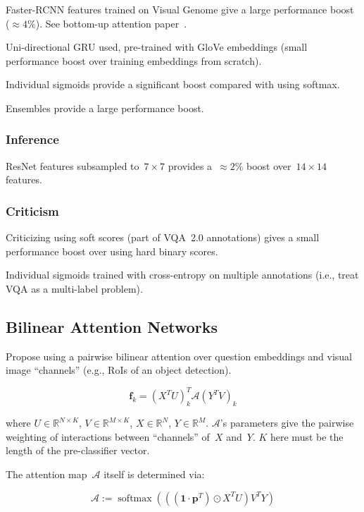 \documentclass[a4paper, 12pt]{article}
\DeclareMathOperator{\softmax}{softmax}
\begin{document}
Faster-RCNN features trained on Visual Genome give a large performance boost
($\approx 4\%$).  See bottom-up attention paper~\citet{anderson2017bottom}.

Uni-directional GRU used, pre-trained with GloVe embeddings (small performance
boost over training embeddings from scratch).

Individual sigmoids provide a significant boost compared with using softmax.

Ensembles provide a large performance boost.


\subsubsection{Inference}

ResNet features subsampled to~$7 \times 7$ provides a~$\approx 2\%$ boost
over~$14 \times 14$ features.


\subsubsection{Criticism}

Criticizing using soft scores (part of VQA~2.0 annotations) gives a small
performance boost over using hard binary scores.

Individual sigmoids trained with cross-entropy on multiple annotations (i.e.,
treat VQA as a multi-label problem).


\subsection{Bilinear Attention Networks}

Propose using a pairwise bilinear attention over question embeddings and visual
image ``channels'' (e.g., RoIs of an object detection).

\begin{equation}
\mathbf{f}_k = {(X^T U)}^T_k \mathcal{A} {(Y^T V)}_k
\end{equation}

where $U \in \mathbb{R}^{N \times K}$, $V \in \mathbb{R}^{M \times K}$,
$X \in \mathbb{R}^N$, $Y \in \mathbb{R}^M$. $\mathcal{A}$'s parameters give the
pairwise weighting of interactions between ``channels'' of~$X$ and~$Y$. $K$
here must be the length of the pre-classifier vector.

The attention map~$\mathcal{A}$ itself is determined via:

\begin{equation}
        \mathcal{A} := \softmax\left(((\mathbf{1} \cdot \mathbf{p}^T) \odot X^T U) V^T Y\right)
\end{equation}
\end{document}
